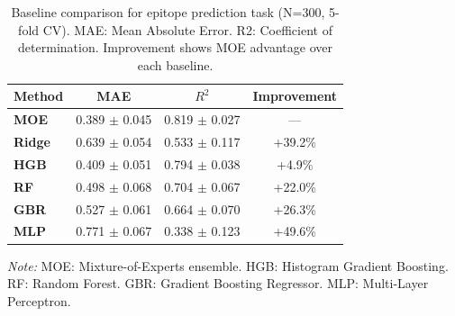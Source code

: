 \begin{table}[htbp]
\centering
\caption{Baseline comparison for epitope prediction task (N=300, 5-fold CV). MAE: Mean Absolute Error. R2: Coefficient of determination. Improvement shows MOE advantage over each baseline.}
\label{tab:baseline}
\begin{tabular}{lccc}
\toprule
Method & MAE & $R^2$ & Improvement \\
\midrule
\textbf{MOE} & 0.389 $\pm$ 0.045 & 0.819 $\pm$ 0.027 & --- \\
\textbf{Ridge} & 0.639 $\pm$ 0.054 & 0.533 $\pm$ 0.117 & +39.2\% \\
\textbf{HGB} & 0.409 $\pm$ 0.051 & 0.794 $\pm$ 0.038 & +4.9\% \\
\textbf{RF} & 0.498 $\pm$ 0.068 & 0.704 $\pm$ 0.067 & +22.0\% \\
\textbf{GBR} & 0.527 $\pm$ 0.061 & 0.664 $\pm$ 0.070 & +26.3\% \\
\textbf{MLP} & 0.771 $\pm$ 0.067 & 0.338 $\pm$ 0.123 & +49.6\% \\
\bottomrule
\end{tabular}
\footnotesize {\textit{Note:} MOE: Mixture-of-Experts ensemble. HGB: Histogram Gradient Boosting. RF: Random Forest. GBR: Gradient Boosting Regressor. MLP: Multi-Layer Perceptron.}
\end{table}
